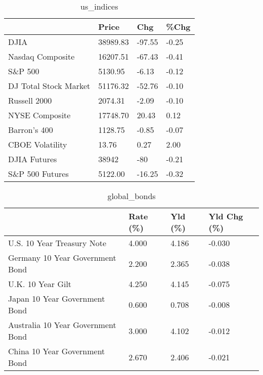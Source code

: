 \documentclass{article}%
\begin{document}
%


\begin{table}[htbp]%
\caption{us\_indices}%
\centering%
\begin{adjustbox}{width=1\textwidth}%
\begin{tabular}{llll}
\toprule
                      &    Price &    Chg &  \%Chg \\
\midrule
                 DJIA & 38989.83 & -97.55 & -0.25 \\
     Nasdaq Composite & 16207.51 & -67.43 & -0.41 \\
              S\&P 500 &  5130.95 &  -6.13 & -0.12 \\
DJ Total Stock Market & 51176.32 & -52.76 & -0.10 \\
         Russell 2000 &  2074.31 &  -2.09 & -0.10 \\
       NYSE Composite & 17748.70 &  20.43 &  0.12 \\
         Barron's 400 &  1128.75 &  -0.85 & -0.07 \\
      CBOE Volatility &    13.76 &   0.27 &  2.00 \\
         DJIA Futures &    38942 &    -80 & -0.21 \\
      S\&P 500 Futures &  5122.00 & -16.25 & -0.32 \\
\bottomrule
\end{tabular}
%
\end{adjustbox}%
\end{table}

%


\begin{table}[htbp]%
\caption{global\_bonds}%
\centering%
\begin{adjustbox}{width=1\textwidth}%
\begin{tabular}{llll}
\toprule
                                  & Rate (\%) & Yld (\%) & Yld Chg (\%) \\
\midrule
       U.S. 10 Year Treasury Note &    4.000 &   4.186 &      -0.030 \\
  Germany 10 Year Government Bond &    2.200 &   2.365 &      -0.038 \\
                U.K. 10 Year Gilt &    4.250 &   4.145 &      -0.075 \\
    Japan 10 Year Government Bond &    0.600 &   0.708 &      -0.008 \\
Australia 10 Year Government Bond &    3.000 &   4.102 &      -0.012 \\
    China 10 Year Government Bond &    2.670 &   2.406 &      -0.021 \\
\bottomrule
\end{tabular}
%
\end{adjustbox}%
\end{table}
\end{document}
